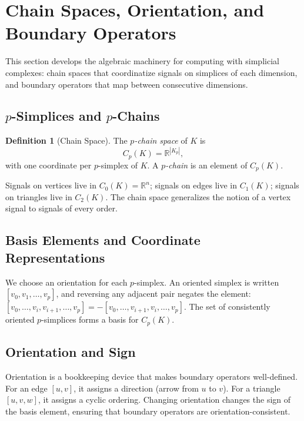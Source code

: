 \documentclass[11pt]{article}
\theoremstyle{definition}
\newtheorem{definition}[theorem]{Definition}
\theoremstyle{remark}
\newcommand{\R}{\mathbb{R}}
\begin{document}
\section{Chain Spaces, Orientation, and Boundary Operators}
\label{sec:chains}

This section develops the algebraic machinery for computing with simplicial
complexes: chain spaces that coordinatize signals on simplices of each
dimension, and boundary operators that map between consecutive dimensions.

\subsection{$p$-Simplices and $p$-Chains}

\begin{definition}[Chain Space]
The \emph{$p$-chain space} of $K$ is
\[
  C_p(K) = \R^{|K_p|},
\]
with one coordinate per $p$-simplex of $K$. A \emph{$p$-chain} is an element
of $C_p(K)$.
\end{definition}

Signals on vertices live in $C_0(K)=\R^n$; signals on edges live in $C_1(K)$;
signals on triangles live in $C_2(K)$. The chain space generalizes the notion
of a vertex signal to signals of every order.

\subsection{Basis Elements and Coordinate Representations}

We choose an orientation for each $p$-simplex. An oriented simplex is written
$[v_0,v_1,\dots,v_p]$, and reversing any adjacent pair negates the element:
$[v_0,\dots,v_i,v_{i+1},\dots,v_p] = -[v_0,\dots,v_{i+1},v_i,\dots,v_p]$.
The set of consistently oriented $p$-simplices forms a basis for $C_p(K)$.

\subsection{Orientation and Sign}

Orientation is a bookkeeping device that makes boundary operators well-defined.
For an edge $[u,v]$, it assigns a direction (arrow from $u$ to $v$). For a
triangle $[u,v,w]$, it assigns a cyclic ordering. Changing orientation changes
the sign of the basis element, ensuring that boundary operators are
orientation-consistent.
\end{document}

